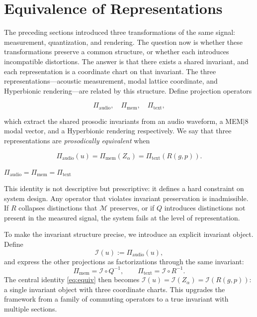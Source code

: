 \documentclass[12pt, a4paper]{article}
\newcommand{\hyperstrong}[1]{\textbf{\Large #1}}
\begin{document}
\section{Equivalence of Representations}

The preceding sections introduced three transformations of the same signal: measurement, quantization, and rendering. The question now is whether these transformations preserve a common structure, or whether each introduces incompatible distortions. The answer is that there exists a shared invariant, and each representation is a coordinate chart on that invariant. The three representations---acoustic measurement, modal lattice coordinate, and Hyperbionic rendering---are related by this structure. Define projection operators

\begin{equation}
\Pi_{\mathrm{audio}},\quad \Pi_{\mathrm{mem}},\quad \Pi_{\mathrm{text}},
\label{eq:projections}
\end{equation}

which extract the shared prosodic invariants from an audio waveform, a MEM$|$8 modal vector, and a Hyperbionic rendering respectively. We say that three representations are \emph{prosodically equivalent} when

\begin{equation}
\Pi_{\mathrm{audio}}(u) = \Pi_{\mathrm{mem}}(Z_\alpha) = \Pi_{\mathrm{text}}(R(g, p)).
\label{eq:equiv}
\end{equation}

\begin{center}
\hyperstrong{$\Pi_{\mathrm{audio}} = \Pi_{\mathrm{mem}} = \Pi_{\mathrm{text}}$}
\end{center}

\noindent This identity is not descriptive but prescriptive: it defines a hard constraint on system design. Any operator that violates invariant preservation is inadmissible. If $R$ collapses distinctions that $\mathcal{M}$ preserves, or if $Q$ introduces distinctions not present in the measured signal, the system fails at the level of representation.

To make the invariant structure precise, we introduce an explicit invariant object. Define
\begin{equation}
\mathcal{I}(u) := \Pi_{\mathrm{audio}}(u),
\label{eq:invariant}
\end{equation}
and express the other projections as factorizations through the same invariant:
\begin{equation}
\Pi_{\mathrm{mem}} = \mathcal{I} \circ Q^{-1}, \qquad \Pi_{\mathrm{text}} = \mathcal{I} \circ R^{-1}.
\label{eq:factorizations}
\end{equation}
The central identity \eqref{eq:equiv} then becomes $\mathcal{I}(u) = \mathcal{I}(Z_\alpha) = \mathcal{I}(R(g,p))$: a single invariant object with three coordinate charts. This upgrades the framework from a family of commuting operators to a true invariant with multiple sections.
\end{document}
